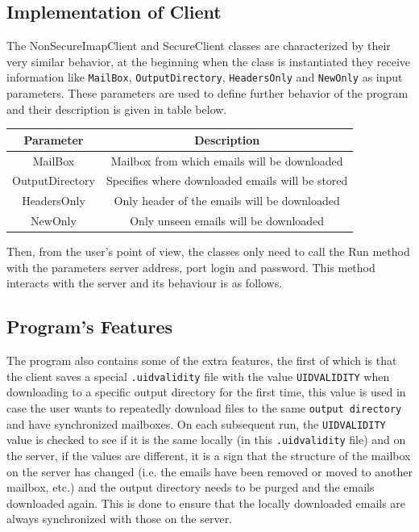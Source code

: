 \documentclass[a4paper,11pt]{article}
\begin{document}
\subsection{Implementation of Client}
The NonSecureImapClient and SecureClient classes are characterized by their very 
similar behavior, at the beginning when the class is instantiated they receive information 
like \verb!MailBox!, \verb!OutputDirectory!, \verb!HeadersOnly! and \verb!NewOnly! as input parameters. 
These parameters are used to define further behavior of the program and their description is given in table below.

\smallskip

\begin{center}
    \vspace{0.5cm} %
    \begin{tabular}{|c|c|}
        \hline
        \textbf{Parameter} & \textbf{Description} \\
        \hline
        MailBox & Mailbox from which emails will be downloaded \\
        \hline
        OutputDirectory & Specifies where downloaded emails will be stored \\
        \hline
        HeadersOnly & Only header of the emails will be downloaded \\
        \hline
        NewOnly & Only unseen emails will be downloaded \\
        \hline
    \end{tabular}
    \vspace{0.5cm} %
\end{center}

Then, from the user's point of view, the classes only need to call the Run method with the parameters 
server address, port login and password. This method interacts with the server and its behaviour is as follows.

\subsection{Program's Features}
The program also contains some of the extra features, the first of which is that the client 
saves a special \verb!.uidvalidity! file with the value \verb!UIDVALIDITY! when downloading 
to a specific output directory for the first time, this value is used in case the user wants 
to repeatedly download files to the same \verb!output directory! and have synchronized mailboxes. 
On each subsequent run, the \verb!UIDVALIDITY! value is checked to see if it is the same locally 
(in this \verb!.uidvalidity! file) and on the server, if the values are different, 
it is a sign that the structure of the mailbox on the server has changed (i.e. the emails 
have been removed or moved to another mailbox, etc.) and the output directory needs to be purged 
and the emails downloaded again. This is done to ensure that the locally downloaded emails 
are always synchronized with those on the server. 
\end{document}
